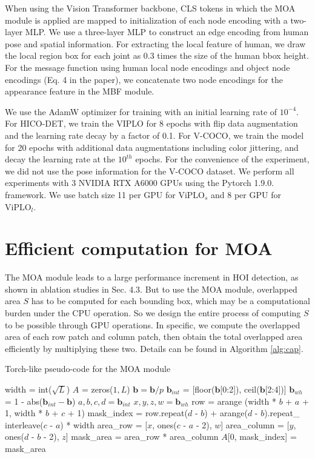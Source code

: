 \documentclass[10pt,twocolumn,letterpaper]{article}
\begin{document}
When using the Vision Transformer backbone, CLS tokens in which the MOA module is applied are mapped to initialization of each node encoding with a two-layer MLP. We use a three-layer MLP to construct an edge encoding from human pose and spatial information. For extracting the local feature of human, we draw the local region box for each joint as 0.3 times the size of the human bbox height. For the message function using human local node encodings and object node encodings (Eq. 4 in the paper), we concatenate two node encodings for the appearance feature in the MBF module. 



We use the AdamW \cite{loshchilov2017decoupled} optimizer for training with an initial learning rate of $10^{-4}$. For HICO-DET, we train the VIPLO for 8 epochs with flip data augmentation and the learning rate decay by a factor of 0.1. For V-COCO, we train the model for 20 epochs with additional data augmentations including color jittering, and decay the learning rate at the $10^{th}$ epochs. For the convenience of the experiment, we did not use the pose information for the V-COCO dataset. We perform all experiments with 3 NVIDIA RTX A6000 GPUs using the Pytorch 1.9.0. framework. We use batch size 11 per GPU for $\textrm{ViPLO}_{s}$ and 8 per GPU for $\textrm{ViPLO}_{l}$.

\section{Efficient computation for MOA}
\label{app:b}
The MOA module leads to a large performance increment in HOI detection, as shown in ablation studies in Sec. 4.3. But to use the MOA module, overlapped area $S$ has to be computed for each bounding box, which may be a computational burden under the CPU operation. So we design the entire process of computing $S$ to be possible through GPU operations. In specific, we compute the overlapped area of each row patch and column patch, then obtain the total overlapped area efficiently by multiplying these two. Details can be found in Algorithm \ref{alg:cap}. 



\begin{algorithm}
\caption{Torch-like pseudo-code for the MOA module}\label{alg:cap}
\begin{algorithmic}[1]
\State width = int($\sqrt{L}$)
\State $A$ = zeros($1, L$) 
\State $\textbf{b} = \textbf{b} / p$ 
\State $\textbf{b}_{int}$ = [floor($\textbf{b}$[0:2]), ceil($\textbf{b}$[2:4])]
\State $\textbf{b}_{wh}$ = 1 - abs($\textbf{b}_{int} - \textbf{b}$)
\State $a, b, c, d = \textbf{b}_{int}$
\State $x, y, z, w = \textbf{b}_{wh}$
\State row = arange (width * $b$ + $a$ + 1, width * $b$ + $c$ + 1)
\State mask\_index = row.repeat($d$ - $b$) + arange($d$ - $b$).repeat\_ interleave($c$ - $a$) * width
\State area\_row = [$x$, ones($c$ - $a$ - 2), $w$]
\State area\_column = [$y$, ones($d$ - $b$ - 2), $z$]
\State mask\_area = area\_row * area\_column
\State $A$[0, mask\_index] = mask\_area
\end{algorithmic}
\end{algorithm}
\end{document}
